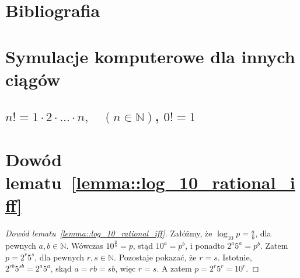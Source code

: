 \documentclass[aspectratio=169]{beamer}
\newcommand{\N}{\mathbb{N}}
\newcommand{\paren}[1]{\!\left(#1 \right)}
\begin{document}
\section{Bibliografia}

\begin{frame}
  {}
  
\end{frame}
\section{Symulacje komputerowe dla innych ciągów}

{\powSubstrPlotsTex}

\subsection{\texorpdfstring{$n! = 1\cdot2\cdot \ldots \cdot n, \quad \paren{n \in \N}$, $0! = 1$}{Silnia}} %

{\factorialSubstrPlotsTex}


\section{\texorpdfstring{Dowód lematu~\protect\ref{lemma::log_10_rational_iff}}{Dowód warunku równoważnego wymierności logarytmu dziesiętnego}}

\begin{frame}
  \begin{proof}[Dowód lematu~\ref{lemma::log_10_rational_iff}]
    Załóżmy, że $\log_{10}p = \frac{a}{b}$, dla pewnych $a, b \in \N$.
    Wówczas $10^{\frac{a}{b}} = p$, stąd $10^a = p^b$, i ponadto $2^a5^a = p^b$.
    Zatem $p = 2^r5^s$, dla pewnych $r, s \in \N$.
    Pozostaje pokazać, że $r = s$.
    Istotnie, $2^{rb}5^{sb} = 2^a5^a$, skąd $a = rb = sb$, więc $r=s$.
    A zatem $p = 2^r5^r = 10^r$.
  \end{proof}
\end{frame}
\end{document}
